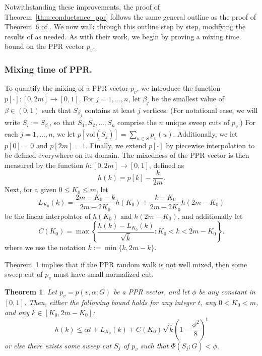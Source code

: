 \documentclass[11pt,twoside]{article}
\newtheorem{theorem}{Theorem}
\newcommand{\set}[1]{\left\{#1\right\}}
\newcommand{\vol}{\mathrm{vol}}
\newcommand{\1}{\mathbf{1}}
\begin{document}
Notwithstanding these improvements, the proof of Theorem~\ref{thm:conductance_ppr} follows the same general outline as the proof of Theorem~6 of \citet{andersen2006}. We now walk through this outline step by step, modifying the results of \citet{andersen2006} as needed. As with their work, we begin by proving a mixing time bound on the PPR vector $p_v$.

\subsubsection{Mixing time of PPR.}

To quantify the mixing of a PPR vector $p_v$, we introduce the function $p[\cdot]: [0,2m] \to [0,1]$. For $j = 1,\ldots,n$, let $\beta_j$ be the smallest value of $\beta \in (0,1)$ such that $S_{\beta_j}$ contains at least $j$ vertices. (For notational ease, we will write $S_{i} := S_{\beta_i}$, so that $S_1,S_2,\ldots,S_n$ comprise the $n$ unique sweep cuts of $p_v$.)
For each $j = 1,\ldots,n$, we let $p[\vol(S_j)] =  \sum_{u \in S} p_v(u)$. Additionally, we let $p[0] = 0$ and $p[2m] = 1$. Finally, we extend $p[\cdot]$  by piecewise interpolation to be defined everywhere on its domain. The mixedness of the PPR vector is then measured by the function $h:[0,2m] \to [0,1]$, defined as 
\begin{equation*}
h(k) = p[k] - \frac{k}{2m}.
\end{equation*}
Next, for a given $0 \leq K_0 \leq m$, let 
\begin{equation*}
L_{K_0}(k) = \frac{2m - K_0 - k}{2m - 2K_0}h(K_0) + \frac{k - K_0}{2m - 2K_0}h(2m - K_0)
\end{equation*}
be the linear interpolator of $h(K_0)$ and $h(2m - K_0)$, and additionally let
\begin{equation*}
C(K_0) = \max\set{\frac{h(k) - L_{K_0}(k)}{\sqrt{\overline{k}}}: K_0 < k < 2m - K_0}.
\end{equation*}
where we use the notation $\overline{k} := \min\{k, 2m - k\}$.

Theorem~\ref{thm:mixing_time_PPR} implies that if the PPR random walk is not well mixed, then some sweep cut of $p_v$ must have small normalized cut.
\begin{theorem}
	\label{thm:mixing_time_PPR}
	Let $p_v = p(v,\alpha;G)$ be a PPR vector, and let $\phi$ be any constant in $[0,1]$. Then, either the following bound holds for any integer $t$, any $0 < K_0 < m$, and any $k \in [K_0,2m - K_0]$:
	\begin{equation}
	\label{eqn:mixing_time_PPR}
	h(k) \leq \alpha t + L_{K_0}(k) + C(K_0)\sqrt{\overline{k}}\left(1 - \frac{\phi^2}{8}\right)^t
	\end{equation}
	or else there exists some sweep cut $S_j$ of $p_v$ such that $\Phi(S_j;G) < \phi$.
\end{theorem}
\end{document}
